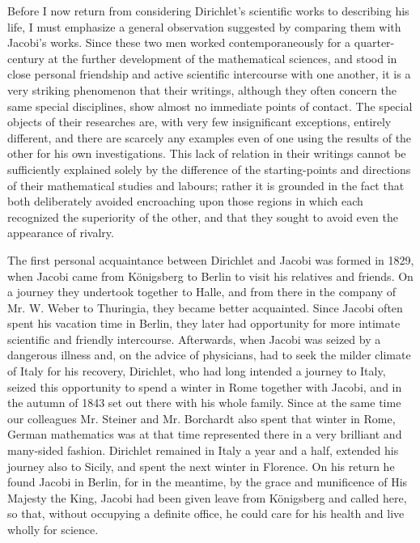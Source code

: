 \documentclass[11pt]{article}
\begin{document}
Before I now return from considering Dirichlet's scientific works to describing his life, I must emphasize a general observation suggested by comparing them with Jacobi's works. Since these two men worked contemporaneously for a quarter-century at the further development of the mathematical sciences, and stood in close personal friendship and active scientific intercourse with one another, it is a very striking phenomenon that their writings, although they often concern the same special disciplines, show almost no immediate points of contact. The special objects of their researches are, with very few insignificant exceptions, entirely different, and there are scarcely any examples even of one using the results of the other for his own investigations. This lack of relation in their writings cannot be sufficiently explained solely by the difference of the starting-points and directions of their mathematical studies and labours; rather it is grounded in the fact that both deliberately avoided encroaching upon those regions in which each recognized the superiority of the other, and that they sought to avoid even the appearance of rivalry.

The first personal acquaintance between Dirichlet and Jacobi was formed in 1829, when Jacobi came from Königsberg to Berlin to visit his relatives and friends. On a journey they undertook together to Halle, and from there in the company of Mr. W. Weber to Thuringia, they became better acquainted. Since Jacobi often spent his vacation time in Berlin, they later had opportunity for more intimate scientific and friendly intercourse. Afterwards, when Jacobi was seized by a dangerous illness and, on the advice of physicians, had to seek the milder climate of Italy for his recovery, Dirichlet, who had long intended a journey to Italy, seized this opportunity to spend a winter in Rome together with Jacobi, and in the autumn of 1843 set out there with his whole family. Since at the same time our colleagues Mr. Steiner and Mr. Borchardt also spent that winter in Rome, German mathematics was at that time represented there in a very brilliant and many-sided fashion. Dirichlet remained in Italy a year and a half, extended his journey also to Sicily, and spent the next winter in Florence. On his return he found Jacobi in Berlin, for in the meantime, by the grace and munificence of His Majesty the King, Jacobi had been given leave from Königsberg and called here, so that, without occupying a definite office, he could care for his health and live wholly for science.
\end{document}
